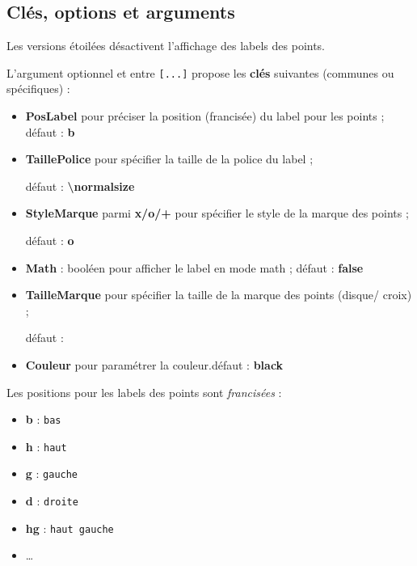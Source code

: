 \documentclass[french,a4paper,11pt]{article}
\newcommand\Cle[1]{{\bfseries\sffamily\textlangle #1\textrangle}}
\newcommand\cmaj[1]{\tcbox[vignetteMaJ]{#1}\xspace}
\begin{document}
\begin{DemoCode}
\end{DemoCode}

\subsection{Clés, options et arguments}

\begin{tipblock}
Les versions étoilées désactivent l'affichage des labels des points.

\smallskip

L'argument optionnel et entre \texttt{[...]} propose les \Cle{clés} suivantes (communes ou spécifiques) :

\begin{itemize}
	\item \Cle{PosLabel} pour préciser la position (francisée) du label pour les points ; \hfill{}défaut : \Cle{b}
	\item \cmaj{0.1.1} \Cle{TaillePolice} pour spécifier la taille de la police du label ;
	
	\hfill{}défaut : \Cle{\textbackslash normalsize}
	\item \Cle{StyleMarque} parmi \Cle{x/o/+} pour spécifier le style de la marque des points ;
	
	\hfill{}défaut : \Cle{o}
	\item \Cle{Math} : booléen pour afficher le label en mode math ; \hfill{}défaut : \Cle{false}
	\item \Cle{TailleMarque} pour spécifier la taille de la marque des points (disque/ croix) ;
	
	\hfill{}défaut : \Cle{2pt}
	\item \Cle{Couleur} pour paramétrer la couleur.\hfill{}défaut : \Cle{black}
\end{itemize}
\vspace*{-\baselineskip}\leavevmode
\end{tipblock}

\begin{tipblock}
Les positions pour les labels des points sont \textit{francisées} :

\begin{itemize}
	\item \Cle{b} : \texttt{bas}
	\item \Cle{h} : \texttt{haut}
	\item \Cle{g} : \texttt{gauche}
	\item \Cle{d} : \texttt{droite}
	\item \Cle{hg} : \texttt{haut gauche}
	\item \ldots
\end{itemize}
\vspace*{-\baselineskip}\leavevmode
\end{tipblock}
\end{document}
